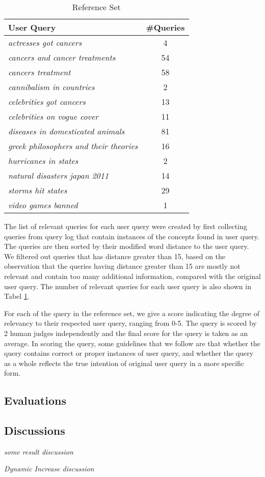 \begin{table}[h]
\centering
\caption{Reference Set}
\begin{tabular}{ | p{5.3 cm} | c | }
\hline
\centering\textbf{User Query} & \textbf{\#Queries}\\ \hline
\textit{actresses got cancers} & 4 \\ \hline
\textit{cancers and cancer treatments} & 54 \\ \hline
\textit{cancers treatment}  & 58 \\ \hline
\textit{cannibalism in countries} & 2 \\ \hline
\textit{celebrities got cancers} & 13 \\ \hline
\textit{celebrities on vogue cover} & 11 \\ \hline
\textit{diseases in domesticated animals} & 81 \\ \hline
\textit{greek philosophers and their theories} & 16 \\ \hline
\textit{hurricanes in states} & 2 \\ \hline
\textit{natural disasters japan 2011} & 14 \\ \hline
\textit{storms hit states} & 29 \\ \hline
\textit{video games banned} & 1 \\ \hline
\end{tabular}
\centering
\label{tab:referenceset}
\end{table}

The list of relevant queries for each user query were created 
by first collecting queries from query log that contain instances 
of the concepts found in user query. The queries are then sorted 
by their modified word distance to the user query. We filtered out 
queries that has distance greater than 15, based on the observation 
that the queries having distance greater than 15 are mostly not
 relevant and contain too many additional information, compared 
 with the original user query. The number of relevant queries for 
 each user query is also shown in Tabel \ref{tab:referenceset}.

For each of the query in the reference set, we give a score indicating 
the degree of relevancy to their respected user query, ranging from 0-5. 
The query is scored by 2 human judges independently and the final 
score for the query is taken as an average. In scoring the query, 
some guidelines that we follow are that whether the query contains 
correct or proper instances of user query, and whether the query as 
a whole reflects the true intention of original user query in a more 
specific form.

\subsection{Evaluations}



\subsection{Discussions}
\textit{some result discussion}

\textit{Dynamic Increase discussion}

